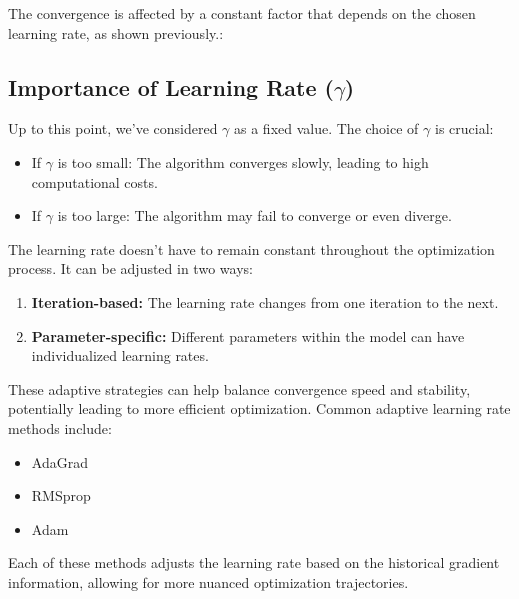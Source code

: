 The convergence is affected by a constant factor that depends on the chosen learning rate, as shown previously.:


\subsection*{Importance of Learning Rate ($\gamma$)}
Up to this point, we've considered $\gamma$ as a fixed value. The choice of $\gamma$ is crucial:

\begin{itemize}
    \item If $\gamma$ is too small: The algorithm converges slowly, leading to high computational costs.
    \item If $\gamma$ is too large: The algorithm may fail to converge or even diverge.
\end{itemize}

The learning rate doesn't have to remain constant throughout the optimization process. It can be adjusted in two ways:

\begin{enumerate}[label=(\alph*)]
    \item \textbf{Iteration-based:} The learning rate changes from one iteration to the next.
    \item \textbf{Parameter-specific:} Different parameters within the model can have individualized learning rates.
\end{enumerate}

These adaptive strategies can help balance convergence speed and stability, potentially leading to more efficient optimization. Common adaptive learning rate methods include:

\begin{itemize}
    \item AdaGrad
    \item RMSprop
    \item Adam
\end{itemize}

Each of these methods adjusts the learning rate based on the historical gradient information, allowing for more nuanced optimization trajectories.

